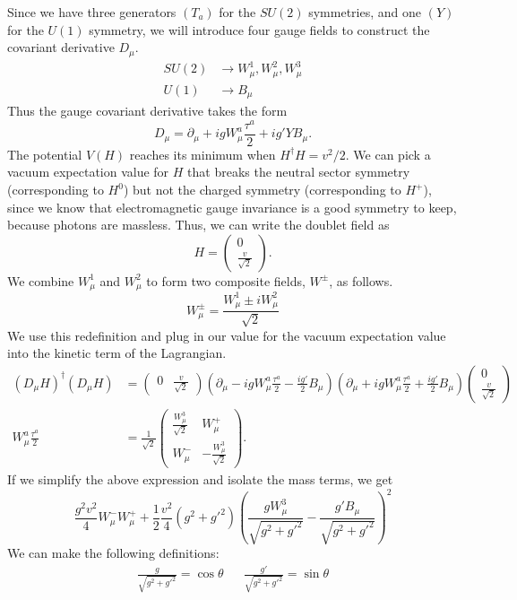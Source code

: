 Since we have three generators $(T_a)$ for the $SU(2)$ symmetries, and one $(Y)$ for the $U(1)$ symmetry, we will introduce four gauge fields to construct the covariant derivative $D_\mu$.
\begin{align*}
  SU(2)&\rightarrow W_\mu^1,W_\mu^2, W_\mu^3\\
  U(1)&\rightarrow B_\mu
\end{align*}
Thus the gauge covariant derivative takes the form
$$D_\mu = \partial_\mu + igW_\mu^a\frac{\tau^a}{2}+ig'YB_\mu.$$
The potential $V(H)$ reaches its minimum when $H^\dag H = v^2 / 2$. We can pick a vacuum expectation value for $H$ that breaks the neutral sector symmetry (corresponding to $H^0$) but not the charged symmetry (corresponding to $H^{+}$), since we know that electromagnetic gauge invariance is a good symmetry to keep, because photons are massless. Thus, we can write the doublet field as
$$H = \left(\begin{array}{c}0\\\frac{v}{\sqrt{2}}\end{array}\right).$$
We combine $W_\mu^1$ and $W_\mu^2$ to form two composite fields, $W^\pm$, as follows.
$$W_\mu^\pm = \frac{W_\mu^1\pm iW_\mu^2}{\sqrt{2}}$$
We use this redefinition and plug in our value for the vacuum expectation value into the kinetic term of the Lagrangian.
\begin{align*}
  (D_\mu H)^\dag(D_\mu H) &= (\begin{array}{cc} 0 & \frac{v}{\sqrt{2}}\end{array})
  \left(\partial_\mu - igW_\mu^a\frac{\tau^a}{2}
  -\frac{ig'}{2}B_\mu\right)
  \left(\partial_\mu+igW_\mu^a\frac{\tau^a}{2}+\frac{ig'}{2}B_\mu\right)
  \left(\begin{array}{c}0\\\frac{v}{\sqrt{2}}\end{array}\right)\\
  W_\mu^a\frac{\tau^a}{2} &= 
  \frac{1}{\sqrt{2}}
  \left(\begin{array}{cc}
    \frac{W_\mu^3}{\sqrt{2}} & W_\mu^+\\
    W_\mu^- & -\frac{W_\mu^3}{\sqrt{2}}
  \end{array}\right).
\end{align*}
If we simplify the above expression and isolate the mass terms, we get
\[\frac{g^2v^2}{4}W_\mu^-W_\mu^++\frac{1}{2}\frac{v^2}{4}(g^2+g'^2)
\left(\frac{gW_\mu^3}{\sqrt{g^2+g'^2}}-\frac{g'B_\mu}{\sqrt{g^2+g'^2}}\right)^2\]
We can make the following definitions:
\begin{align*}
  \frac{g}{\sqrt{g^2+g'^2}} = \cos\theta &&
  \frac{g'}{\sqrt{g^2+g'^2}} = \sin\theta
\end{align*}
